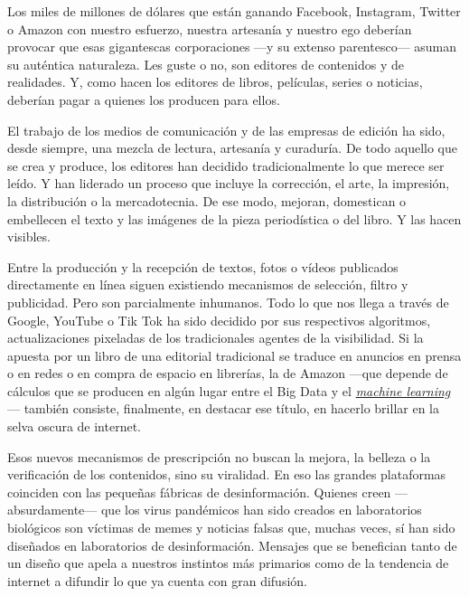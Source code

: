 Los miles de millones de dólares que están ganando Facebook, Instagram,
Twitter o Amazon con nuestro esfuerzo, nuestra artesanía y nuestro ego
deberían provocar que esas gigantescas corporaciones ---y su extenso
parentesco--- asuman su auténtica naturaleza. Les guste o no, son
editores de contenidos y de realidades. Y, como hacen los editores de
libros, películas, series o noticias, deberían pagar a quienes los
producen para ellos.

El trabajo de los medios de comunicación y de las empresas de edición ha
sido, desde siempre, una mezcla de lectura, artesanía y curaduría. De
todo aquello que se crea y produce, los editores han decidido
tradicionalmente lo que merece ser leído. Y han liderado un proceso que
incluye la corrección, el arte, la impresión, la distribución o la
mercadotecnia. De ese modo, mejoran, domestican o embellecen el texto y
las imágenes de la pieza periodística o del libro. Y las hacen visibles.

Entre la producción y la recepción de textos, fotos o vídeos publicados
directamente en línea siguen existiendo mecanismos de selección, filtro
y publicidad. Pero son parcialmente inhumanos. Todo lo que nos llega a
través de Google, YouTube o Tik Tok ha sido decidido por sus respectivos
algoritmos, actualizaciones pixeladas de los tradicionales agentes de la
visibilidad. Si la apuesta por un libro de una editorial tradicional se
traduce en anuncios en prensa o en redes o en compra de espacio en
librerías, la de Amazon ---que depende de cálculos que se producen en
algún lugar entre el Big Data y el
\href{https://www.bbva.com/es/machine-learning-que-es-y-como-funciona/}{\emph{machine
learning}}--- también consiste, finalmente, en destacar ese título, en
hacerlo brillar en la selva oscura de internet.

Esos nuevos mecanismos de prescripción no buscan la mejora, la belleza o
la verificación de los contenidos, sino su viralidad. En eso las grandes
plataformas coinciden con las pequeñas fábricas de desinformación.
Quienes creen ---absurdamente--- que los virus pandémicos han sido
creados en laboratorios biológicos son víctimas de memes y noticias
falsas que, muchas veces, sí han sido diseñados en laboratorios de
desinformación. Mensajes que se benefician tanto de un diseño que apela
a nuestros instintos más primarios como de la tendencia de internet a
difundir lo que ya cuenta con gran difusión.


